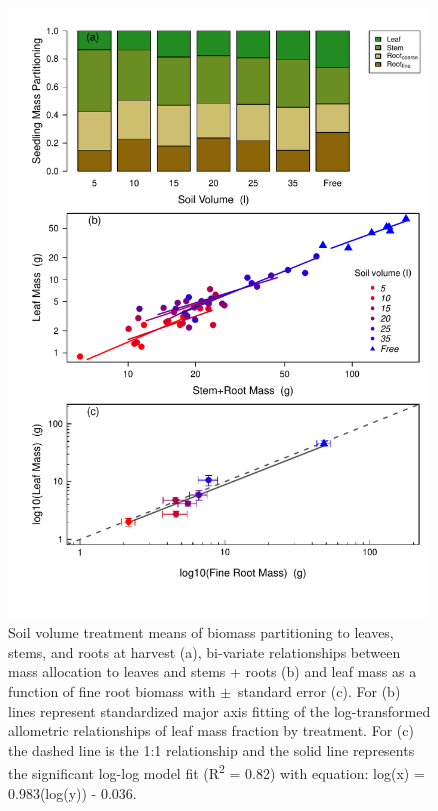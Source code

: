 \documentclass[a4paper]{article}\usepackage[]{graphicx}\usepackage[]{color}
\begin{document}
\begin{figure}[h!]
    \centering
    \includegraphics[width=0.99\textwidth]{massfractions.pdf}
    \caption{Soil volume treatment means of biomass partitioning to leaves, stems, and roots at harvest (a), bi-variate relationships between mass allocation to leaves and stems + roots (b) and leaf mass as a function of fine root biomass with $\pm$~standard error (c). For (b) lines represent standardized major axis fitting of the log-transformed allometric relationships of leaf mass fraction by treatment. For (c) the dashed line is the 1:1 relationship and the solid line represents the significant log-log model fit (R\textsuperscript{2} = 0.82) with equation: log(x) = 0.983(log(y)) - 0.036.}
    \label{fig:figure 2.3}
\end{figure}
\end{document}
